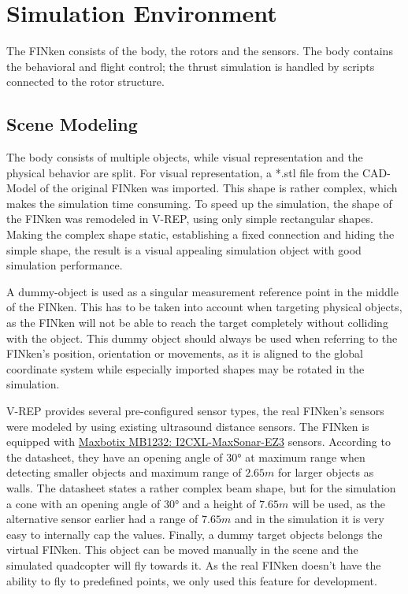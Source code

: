 \label{chap:implementation}

\section{Simulation Environment}

The FINken consists of the body, the rotors and the sensors. 
The body contains the behavioral and flight control; the thrust simulation is handled by scripts connected to the rotor structure.

\subsection{Scene Modeling}
\label{sec:sceneMod}

The body consists of multiple objects, while visual representation and the physical behavior are split. 
For visual representation, a *.stl file from the CAD-Model of the original FINken was imported. 
This shape is rather complex, which makes the simulation time consuming. 
To speed up the simulation, the shape of the FINken was remodeled in V-REP, using only simple rectangular shapes. 
Making the complex shape static, establishing a fixed connection and hiding the simple shape, the result is a visual appealing simulation object with good simulation performance. 

A dummy-object is used as a singular measurement reference point in the middle of the FINken. 
This has to be taken into account when targeting physical objects, as the FINken will not be able to reach the target completely without colliding with the object. 
This dummy object should always be used when referring to the FINken's position, orientation or movements, as it is aligned to the global coordinate system while especially imported shapes may be rotated in the simulation. 

V-REP provides several pre-configured sensor types, the real FINken's sensors were modeled by using existing ultrasound distance sensors. 
The FINken is equipped with \href{http://www.maxbotix.com/documents/I2CXL-MaxSonar-EZ_Datasheet.pdf}{Maxbotix MB1232: I2CXL-MaxSonar-EZ3} sensors. 
According to the datasheet, they have an opening angle of $\ang{30}$ at maximum range when detecting smaller objects and maximum range of $2.65m$ for larger objects as walls. 
The datasheet states a rather complex beam shape, but for the simulation a cone with an opening angle of $\ang{30}$  and a height of $7.65m$ will be used, as the alternative sensor earlier had a range of $7.65m$ and in the simulation it is very easy to internally cap the values. 
Finally, a dummy target objects belongs the virtual FINken. 
This object can be moved manually in the scene and the simulated quadcopter will fly towards it.  
As the real FINken doesn't have the ability to fly to predefined points, we only used this feature for development.

